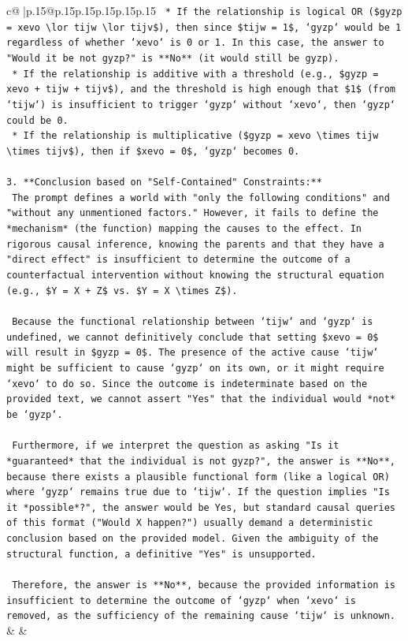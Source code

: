 \documentclass{article}
\begin{document}
{\begin{supertabular}{c@{$\;$}|p{.15\linewidth}@{}p{.15\linewidth}p{.15\linewidth}p{.15\linewidth}p{.15\linewidth}p{.15\linewidth}}
{{{\texttt{        *   If the relationship is logical OR (\$gyzp = xevo \textbackslash{}lor tijw \textbackslash{}lor tijv\$), then since \$tijw = 1\$, `gyzp` would be 1 regardless of whether `xevo` is 0 or 1. In this case, the answer to "Would it be not gyzp?" is **No** (it would still be gyzp).} \\
\texttt{        *   If the relationship is additive with a threshold (e.g., \$gyzp = xevo + tijw + tijv\$), and the threshold is high enough that \$1\$ (from `tijw`) is insufficient to trigger `gyzp` without `xevo`, then `gyzp` could be 0.} \\
\texttt{        *   If the relationship is multiplicative (\$gyzp = xevo \textbackslash{}times tijw \textbackslash{}times tijv\$), then if \$xevo = 0\$, `gyzp` becomes 0.} \\
\\ 
\texttt{3.  **Conclusion based on "Self{-}Contained" Constraints:**} \\
\texttt{    The prompt defines a world with "only the following conditions" and "without any unmentioned factors." However, it fails to define the *mechanism* (the function) mapping the causes to the effect. In rigorous causal inference, knowing the parents and that they have a "direct effect" is insufficient to determine the outcome of a counterfactual intervention without knowing the structural equation (e.g., \$Y = X + Z\$ vs. \$Y = X \textbackslash{}times Z\$).} \\
\\ 
\texttt{    Because the functional relationship between `tijw` and `gyzp` is undefined, we cannot definitively conclude that setting \$xevo = 0\$ will result in \$gyzp = 0\$. The presence of the active cause `tijw` might be sufficient to cause `gyzp` on its own, or it might require `xevo` to do so. Since the outcome is indeterminate based on the provided text, we cannot assert "Yes" that the individual would *not* be `gyzp`.} \\
\\ 
\texttt{    Furthermore, if we interpret the question as asking "Is it *guaranteed* that the individual is not gyzp?", the answer is **No**, because there exists a plausible functional form (like a logical OR) where `gyzp` remains true due to `tijw`. If the question implies "Is it *possible*?", the answer would be Yes, but standard causal queries of this format ("Would X happen?") usually demand a deterministic conclusion based on the provided model. Given the ambiguity of the structural function, a definitive "Yes" is unsupported.} \\
\\ 
\texttt{    Therefore, the answer is **No**, because the provided information is insufficient to determine the outcome of `gyzp` when `xevo` is removed, as the sufficiency of the remaining cause `tijw` is unknown.} \\
            }
        }
    }
    & & \\ \\


\end{supertabular}}
\end{document}
